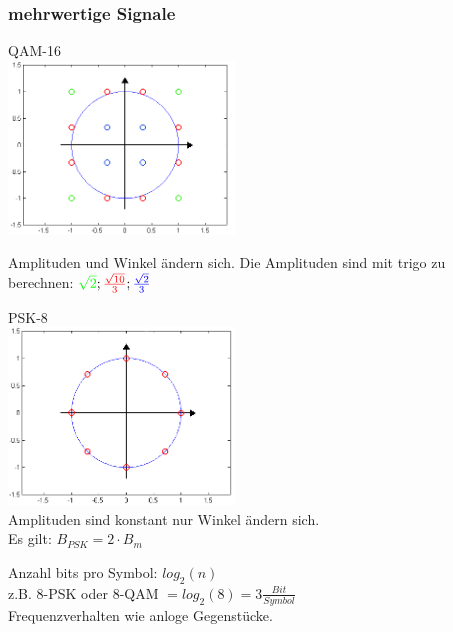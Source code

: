 \subsubsection{mehrwertige Signale}
\begin{multicols}{2}
    \begin{center}
	QAM-16\\
	\includegraphics[width=6cm]{bilder/qam_16.png}\\
	\end{center}
	Amplituden und Winkel ändern sich.
	Die Amplituden sind mit trigo zu berechnen:
	$\textcolor{green}{\sqrt{2}}; \textcolor{red}{\frac{\sqrt{10}}{3}}; \textcolor{blue}{\frac{\sqrt{2}}{3}}$
	\columnbreak

    \begin{center}
	PSK-8\\
	\includegraphics[width=6cm]{bilder/psk_8.png}\\
	Amplituden sind konstant nur Winkel ändern sich.\\
	Es gilt: $B_{PSK} = 2\cdot B_m$
	\end{center} 

\end{multicols}
	Anzahl bits pro Symbol: $log_2\left(n\right)$\\
	z.B. 8-PSK oder 8-QAM $= log_2(8) = 3 \frac{Bit}{Symbol}$\\
	Frequenzverhalten wie anloge Gegenstücke.
